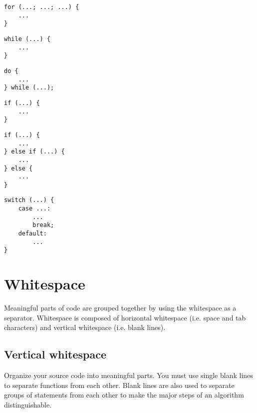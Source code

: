 \documentclass{article}
\begin{document}
\begin{multicols}{2}
\begin{lstlisting}
for (...; ...; ...) {
    ...
}
\end{lstlisting}

\begin{lstlisting}
while (...) {
    ...
}
\end{lstlisting}

\begin{lstlisting}
do {
    ...
} while (...);
\end{lstlisting}

\begin{lstlisting}
if (...) {
    ...
}
\end{lstlisting}
\vfill
\columnbreak

\begin{lstlisting}
if (...) {
    ...
} else if (...) {
    ...
} else {
    ...
}
\end{lstlisting}

\begin{lstlisting}
switch (...) {
    case ...:
        ...
        break;
    default:
        ...
}
\end{lstlisting}
\end{multicols}

\section{Whitespace}
Meaningful parts of code are grouped together by using the whitespace as a separator.
Whitespace is composed of horizontal whitespace (i.e. space and tab characters) and vertical whitespace (i.e. blank lines).

\subsection{Vertical whitespace}
Organize your source code into meaningful parts.
You must use single blank lines to separate functions from each other.
Blank lines are also used to separate groups of statements from each other to make the major steps of an algorithm distinguishable.
\end{document}
